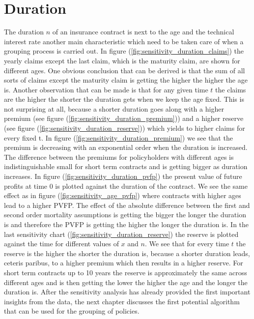 \section{Duration}
\label{sec:duration}
The duration $n$ of an insurance contract is next to the age and the technical interest rate another main characteristic which need to be taken care of when a grouping process is carried out. In figure (\ref{fig:sensitivity_duration_claims}) the yearly claims except the last claim, which is the maturity claim, are shown for different ages. One obvious conclusion that can be derived is that the sum of all sorts of claims except the maturity claim is getting the higher the higher the age is. Another observation that can be made is that for any given time $t$ the claims are the higher the shorter the duration gets when we keep the age fixed. This is not surprising at all, because a shorter duration goes along with a higher premium (see figure (\ref{fig:sensitivity_duration_premium})) and a higher reserve (see figure (\ref{fig:sensitivity_duration_reserve})) which yields to higher claims for every fixed t.  In figure (\ref{fig:sensitivity_duration_premium}) we see that the premium is decreasing with an exponential order when the duration is increased. The difference between the premiums for policyholders with different ages is indistinguishable small for short term contracts and is getting bigger as duration increases. In figure (\ref{fig:sensitivity_duration_pvfp}) the present  value of future profits at time 0 is plotted against the duration of the contract. We see the same effect as in figure (\ref{fig:sensitivity_age_pvfp}) where contracts with higher ages lead to a higher PVFP. The effect of the absolute difference between the first and second order mortality assumptions is getting the bigger the longer the duration is and therefore the PVFP is getting the higher the longer the duration is. In the last sensitivity chart (\ref{fig:sensitivity_duration_reserve}) the reserve is plotted against the time for different values of $x$ and $n$. We see that for every time $t$ the reserve is the higher the shorter the duration is, because a shorter duration leads, ceteris paribus, to a higher premium which then results in a higher reserve. For short term contracts up to 10 years the reserve is approximately the same across different ages and is then getting the lower the higher the age and the  longer the duration is. After the sensitivity analysis has already provided the first important insights from the data, the next chapter discusses the first potential algorithm that can be used for the grouping of policies. 
